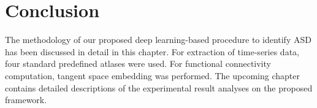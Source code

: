 \section{Conclusion}
The methodology of our proposed deep learning-based procedure to identify ASD has been
discussed in detail in this chapter. For extraction of time-series data, four standard predefined
atlases were used. For functional connectivity computation, tangent space embedding was
performed. The upcoming chapter contains detailed descriptions of the experimental result
analyses on the proposed framework.